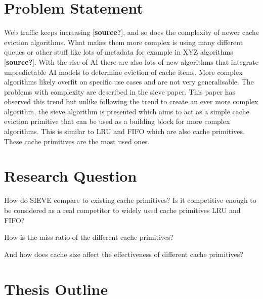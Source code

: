 \section{Problem Statement}


Web traffic keeps increasing [\textbf{source?}], and so does the complexity of newer cache eviction algorithms. What makes them more complex is using many different queues or other stuff like lots of metadata for example in XYZ algorithms [\textbf{source?}]. With the rise of AI there are also lots of new algorithms that integrate unpredictable AI models to determine eviction of cache items. More complex algorithms likely overfit on specific use cases and are not very generalisable. The problems with complexity are described in the sieve paper. This paper has observed this trend but unlike following the trend to create an ever more complex algorithm, the sieve algorithm is presented which aims to act as a simple cache eviction primitive that can be used as a building block for more complex algorithms. This is similar to LRU and FIFO which are also cache primitives. These cache primitives are the most used ones.

\section{Research Question}\label{sec: research_q}


How do SIEVE compare to existing cache primitives? Is it competitive enough to be considered as a real competitor to widely used cache primitives LRU and FIFO?

How is the miss ratio of the different cache primitives?

And how does cache size affect the effectiveness of different cache primitives?

\section{Thesis Outline}

